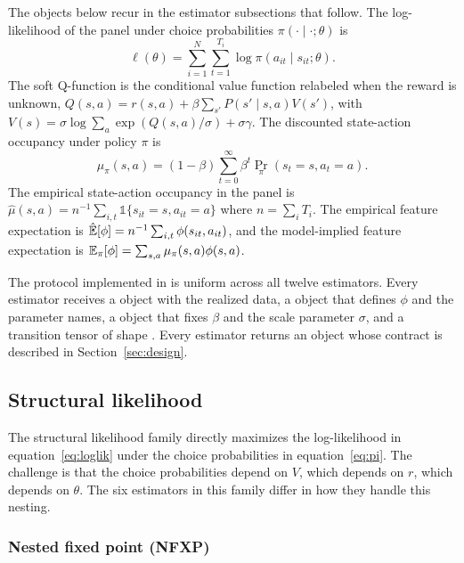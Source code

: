 The objects below recur in the estimator subsections that follow. The log-likelihood of the panel under choice probabilities $\pi(\cdot \mid \cdot ; \theta)$ is
\begin{equation}
\ell(\theta) = \sum_{i=1}^N \sum_{t=1}^{T_i} \log \pi(a_{it} \mid s_{it}; \theta).
\label{eq:loglik}
\end{equation}
The soft Q-function is the conditional value function relabeled when the reward is unknown, $Q(s, a) = r(s, a) + \beta \sum_{s'} P(s' \mid s, a) V(s')$, with $V(s) = \sigma \log \sum_a \exp(Q(s, a) / \sigma) + \sigma \gamma$. The discounted state-action occupancy under policy $\pi$ is
\begin{equation}
\mu_\pi(s, a) = (1 - \beta) \sum_{t=0}^{\infty} \beta^t \Pr_\pi(s_t = s, a_t = a).
\label{eq:occ}
\end{equation}
The empirical state-action occupancy in the panel is $\hat\mu(s, a) = n^{-1} \sum_{i, t} \mathbb{1}\{s_{it} = s, a_{it} = a\}$ where $n = \sum_i T_i$. The empirical feature expectation is $\hat {\mathbb{E}}[\phi] = n^{-1} \sum_{i, t} \phi(s_{it}, a_{it})$, and the model-implied feature expectation is $\mathbb{E}_\pi[\phi] = \sum_{s, a} \mu_\pi(s, a) \phi(s, a)$.

The protocol implemented in  is uniform across all twelve estimators. Every estimator receives a  object with the realized data, a  object that defines $\phi$ and the parameter names, a  object that fixes $\beta$ and the scale parameter $\sigma$, and a transition tensor of shape . Every estimator returns an  object whose contract is described in Section~\ref{sec:design}.

\subsection{Structural likelihood} \label{sec:methods:structural}

The structural likelihood family directly maximizes the log-likelihood in equation~\eqref{eq:loglik} under the choice probabilities in equation~\eqref{eq:pi}. The challenge is that the choice probabilities depend on $V$, which depends on $r$, which depends on $\theta$. The six estimators in this family differ in how they handle this nesting.

\subsubsection{Nested fixed point (NFXP)}

